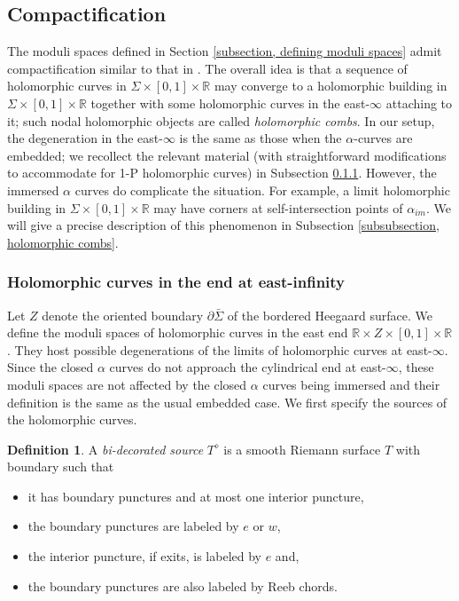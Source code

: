 \documentclass{amsart}
\theoremstyle{definition}
\newtheorem{defn}[thm]{Definition}
\theoremstyle{remark}
\numberwithin{equation}{section}
\numberwithin{equation}{section} \makeatletter
\begin{document}
\subsection{Compactification}
The moduli spaces defined in Section \ref{subsection, defining moduli spaces} admit compactification similar to that in \cite{LOT18}. The overall idea is that a sequence of holomorphic curves in $\Sigma\times[0,1]\times \mathbb{R}$ may converge to a holomorphic building in $\Sigma\times[0,1]\times \mathbb{R}$ together with some holomorphic curves in the east-$\infty$ attaching to it; such nodal holomorphic objects are called \emph{holomorphic combs}. In our setup, the degeneration in the east-$\infty$ is the same as those when the $\alpha$-curves are embedded; we recollect the relevant material (with straightforward modifications to accommodate for 1-P holomorphic curves) in Subsection \ref{subsubsection, holomorphic curves in east infinty}. However, the immersed $\alpha$ curves do complicate the situation. For example, a limit holomorphic building in $\Sigma\times[0,1]\times \mathbb{R}$ may have corners at self-intersection points of $\alpha_{im}$. We will give a precise description of this phenomenon in Subsection \ref{subsubsection, holomorphic combs}.



\subsubsection{Holomorphic curves in the end at east-infinity}\label{subsubsection, holomorphic curves in east infinty} Let $Z$ denote the oriented boundary $\partial\bar{\Sigma}$ of the bordered Heegaard surface. We define the moduli spaces of holomorphic curves in the east end $\mathbb{R}\times Z \times [0,1]\times \mathbb{R}$. They host possible degenerations of the limits of holomorphic curves at east-$\infty$. Since the closed $\alpha$ curves do not approach the cylindrical end at east-$\infty$, these moduli spaces are not affected by the closed $\alpha$ curves being immersed and their definition is the same as the usual embedded case. We first specify the sources of the holomorphic curves.
\begin{defn}
A \emph{bi-decorated source} $T^\diamond$ is a smooth Riemann surface $T$ with boundary such that 
\begin{itemize}
\item[(1)]it has boundary punctures and at most one interior puncture,
\item[(2)]the boundary punctures are labeled by $e$ or $w$,  
\item[(3)]the interior puncture, if exits, is labeled by $e$ and,
\item[(4)]the boundary punctures are also labeled by Reeb chords.
\end{itemize} 
\end{defn}
\end{document}
